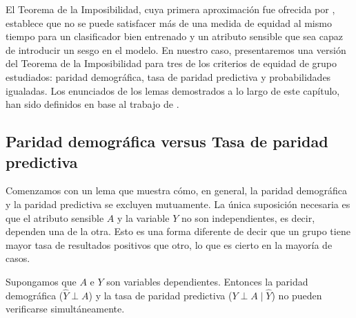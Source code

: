 \documentclass[oneside,openright,titlepage,numbers=noenddot,openany,headinclude,footinclude=true,
cleardoublepage=empty,abstractoff,BCOR=5mm,paper=a4,fontsize=12pt,main=spanish]{scrreprt}
\begin{document}
El Teorema de la Imposibilidad, cuya primera aproximación fue ofrecida por \cite{fairth2016}, establece que no se puede satisfacer más de una medida de equidad al mismo tiempo para un clasificador bien entrenado y un atributo sensible que sea capaz de introducir un sesgo en el modelo. En nuestro caso, presentaremos una versión del Teorema de la Imposibilidad para tres de los criterios de equidad de grupo estudiados: paridad demográfica, tasa de paridad predictiva y probabilidades igualadas. Los enunciados de los lemas demostrados a lo largo de este capítulo, han sido definidos en base al trabajo de \cite{fairnesslearning2019}.


\subsection{Paridad demográfica versus Tasa de paridad predictiva}

Comenzamos con un lema que muestra cómo, en general, la paridad demográfica y la paridad predictiva se excluyen mutuamente. La única suposición necesaria es que el atributo sensible $A$ y la variable $Y$ no son independientes, es decir, dependen una de la otra. Esto es una forma diferente de decir que un grupo tiene mayor tasa de resultados positivos que otro, lo que es cierto en la mayoría de casos.

\clearpage

\begin{lemma} 
Supongamos que $A$ e $Y$ son variables dependientes. Entonces la paridad demográfica ($\hat{Y} \perp A$) y la tasa de paridad predictiva ($Y \perp A \mid \hat{Y}$) no pueden verificarse simultáneamente.
\label{lem:demopred}
\end{lemma}
\end{document}
